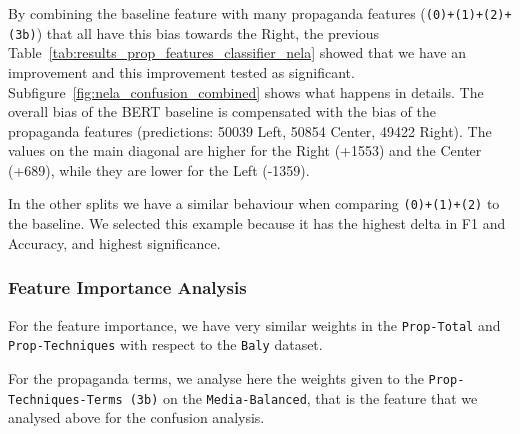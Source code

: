 By combining the baseline feature with many propaganda features (\texttt{(0)+(1)+(2)+(3b)}) that all have this bias towards the Right, the previous Table~\ref{tab:results_prop_features_classifier_nela} showed that we have an improvement and this improvement tested as significant.
Subfigure~\ref{fig:nela_confusion_combined} shows what happens in details. The overall bias of the BERT baseline is compensated with the bias of the propaganda features (predictions: 50039 Left, 50854 Center, 49422 Right).
The values on the main diagonal are higher for the Right (+1553) and the Center (+689), while they are lower for the Left (-1359).

In the other splits we have a similar behaviour when comparing \texttt{(0)+(1)+(2)} to the baseline. We selected this example because it has the highest delta in F1 and Accuracy, and highest significance. 


\subsubsection{Feature Importance Analysis}

For the feature importance, we have very similar weights in the \texttt{Prop-Total} and \texttt{Prop-Techniques} with respect to the \texttt{Baly} dataset.

For the propaganda terms, we analyse here the weights given to the \texttt{Prop-Techniques-Terms (3b)} on the \texttt{Media-Balanced}, that is the feature that we analysed above for the confusion analysis.

